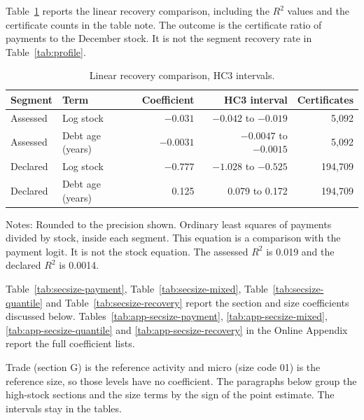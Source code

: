 Table~\ref{tab:recoveryfit} reports the linear recovery comparison, including the $R^2$ values and the certificate counts in the table note.
The outcome is the certificate ratio of payments to the December stock.
It is not the segment recovery rate in Table~\ref{tab:profile}.

\begin{table}[t]
\centering
\caption{Linear recovery comparison, HC3 intervals.}\label{tab:recoveryfit}
\begin{tabular}{llrrr}
\toprule
Segment & Term & Coefficient & HC3 interval & Certificates \\
\midrule
Assessed & Log stock & $-0.031$ & $-0.042$ to $-0.019$ & 5,092 \\
Assessed & Debt age (years) & $-0.0031$ & $-0.0047$ to $-0.0015$ & 5,092 \\
Declared & Log stock & $-0.777$ & $-1.028$ to $-0.525$ & 194,709 \\
Declared & Debt age (years) & 0.125 & 0.079 to 0.172 & 194,709 \\
\bottomrule
\end{tabular}

\vspace{0.4em}
\begin{minipage}{0.95\textwidth}
\footnotesize
Notes: Rounded to the precision shown.
Ordinary least squares of payments divided by stock, inside each segment.
This equation is a comparison with the payment logit.
It is not the stock equation.
The assessed $R^2$ is 0.019 and the declared $R^2$ is 0.0014.
\end{minipage}
\end{table}

\clearpage
Table~\ref{tab:secsize-payment}, Table~\ref{tab:secsize-mixed}, Table~\ref{tab:secsize-quantile} and Table~\ref{tab:secsize-recovery} report the section and size coefficients discussed below.
Tables~\ref{tab:app-secsize-payment}, \ref{tab:app-secsize-mixed}, \ref{tab:app-secsize-quantile} and \ref{tab:app-secsize-recovery} in the Online Appendix report the full coefficient lists.






Trade (section G) is the reference activity and micro (size code 01) is the reference size, so those levels have no coefficient.
The paragraphs below group the high-stock sections and the size terms by the sign of the point estimate.
The intervals stay in the tables.

